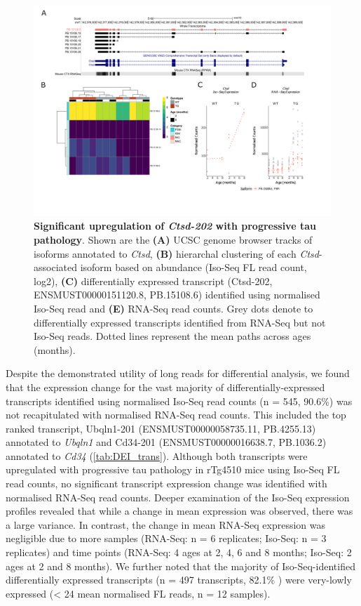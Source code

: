 \begin{landscape}
	\begin{figure}[!htp]
		\centering
		\includegraphics[page=1,trim={1.5cm 2.5cm 2cm 2cm}, scale = 0.85]{Figures/Ch5_DiffPlots_Landscape.pdf}
		\captionsetup{width=1.5\textwidth}
		\caption[Differential Isoform Expression: \textit{Ctsd}]%
		{\textbf{Significant upregulation of \textit{Ctsd-202} with progressive tau pathology}. Shown are the \textbf{(A)} UCSC genome browser tracks of isoforms annotated to \textit{Ctsd}, \textbf{(B)} hierarchal clustering of each \textit{Ctsd}-associated isoform based on abundance (Iso-Seq FL read count, log2), \textbf{(C)} differentially expressed transcript (Ctsd-202, ENSMUST00000151120.8, PB.15108.6) identified using normalised Iso-Seq read and \textbf{(E)} RNA-Seq read counts. Grey dots denote to differentially expressed transcripts identified from RNA-Seq but not Iso-Seq reads. Dotted lines represent the mean paths across ages (months).}   
		\label{fig:Ctsd}
	\end{figure}	
\end{landscape}

Despite the demonstrated utility of long reads for differential analysis, we found that the expression change for the vast majority of differentially-expressed transcripts identified using normalised Iso-Seq read counts (n = 545, 90.6\%) was not recapitulated with normalised RNA-Seq read counts. This included the top ranked transcript, Ubqln1-201 (ENSMUST00000058735.11, PB.4255.13) annotated to \textit{Ubqln1} and Cd34-201 (ENSMUST00000016638.7, PB.1036.2) annotated to \textit{Cd34} (\cref{tab:DEI_trans}). Although both transcripts were upregulated with progressive tau pathology in rTg4510 mice using Iso-Seq FL read counts, no significant transcript expression change was identified with normalised RNA-Seq read counts. Deeper examination of the Iso-Seq expression profiles revealed that while a change in mean expression was observed, there was a large variance. In contrast, the change in mean RNA-Seq expression was negligible due to more samples (RNA-Seq: n = 6 replicates; Iso-Seq: n = 3 replicates) and time points (RNA-Seq: 4 ages at 2, 4, 6 and 8 months; Iso-Seq: 2 ages at 2 and 8 months). We further noted that the majority of Iso-Seq-identified differentially expressed transcripts (n = 497 transcripts, 82.1\% ) were very-lowly expressed (< 24 mean normalised FL reads, n = 12 samples). 

